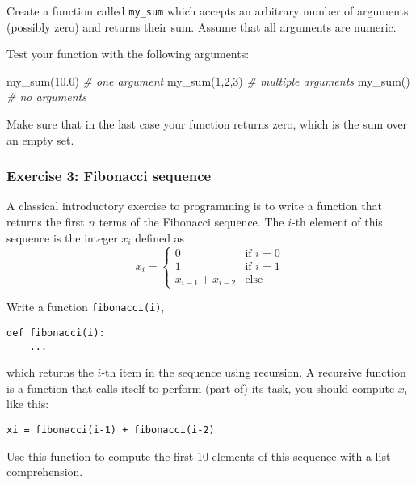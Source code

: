 \documentclass{scrartcl}
\newenvironment{Shaded}{}{}
\newcommand{\DecValTok}[1]{\textcolor[rgb]{0.25,0.63,0.44}{{#1}}}
\newcommand{\FloatTok}[1]{\textcolor[rgb]{0.25,0.63,0.44}{{#1}}}
\newcommand{\CommentTok}[1]{\textcolor[rgb]{0.38,0.63,0.69}{\textit{{#1}}}}
\newcommand{\NormalTok}[1]{{#1}}
\begin{document}
Create a function called \texttt{my\_sum} which accepts an arbitrary
number of arguments (possibly zero) and returns their sum. Assume that
all arguments are numeric.

Test your function with the following arguments:

\begin{Shaded}
\begin{Highlighting}[]
\NormalTok{my\_sum(}\FloatTok{10.0}\NormalTok{)    }\CommentTok{\# one argument}
\NormalTok{my\_sum(}\DecValTok{1}\NormalTok{,}\DecValTok{2}\NormalTok{,}\DecValTok{3}\NormalTok{)   }\CommentTok{\# multiple arguments}
\NormalTok{my\_sum()        }\CommentTok{\# no arguments}
\end{Highlighting}
\end{Shaded}

Make sure that in the last case your function returns zero, which is the
sum over an empty set.

    \hypertarget{exercise-3-fibonacci-sequence}{%
\subsubsection{Exercise 3: Fibonacci
sequence}\label{exercise-3-fibonacci-sequence}}

A classical introductory exercise to programming is to write a function
that returns the first \(n\) terms of the Fibonacci sequence. The
\(i\)-th element of this sequence is the integer \(x_i\) defined as \[
x_i = 
\begin{cases} 0 & \text{if } i = 0   \\
    1  & \text{if } i = 1\\
    x_{i-1} + x_{i-2} & \text{else}
\end{cases}
\]

Write a function \texttt{fibonacci(i)},

\begin{verbatim}
def fibonacci(i):
    ...
\end{verbatim}

which returns the \(i\)-th item in the sequence using recursion. A
recursive function is a function that calls itself to perform (part of)
its task, \ie you should compute \(x_i\) like this:

\begin{verbatim}
xi = fibonacci(i-1) + fibonacci(i-2)
\end{verbatim}

Use this function to compute the first 10 elements of this sequence with
a list comprehension.
\end{document}
